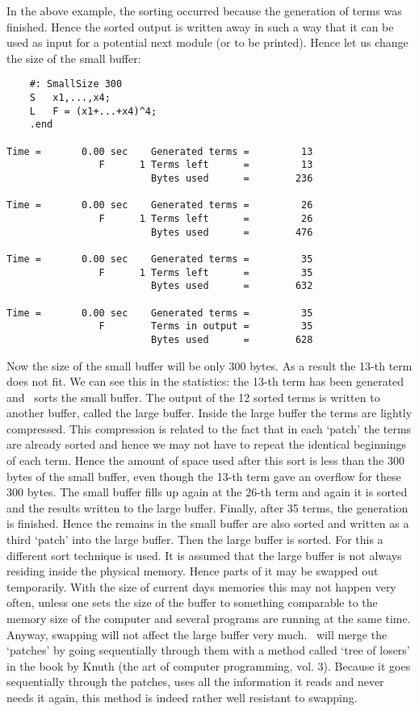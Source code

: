 In the above example, the sorting occurred because the generation of terms 
was finished. Hence the sorted output is written away in such a way that it 
can be used as input for a potential next module (or to be printed). 
Hence let us change the size of the small buffer:
\begin{verbatim}
    #: SmallSize 300
    S	x1,...,x4;
    L	F = (x1+...+x4)^4;
    .end

Time =       0.00 sec    Generated terms =         13
                F      1 Terms left      =         13
                         Bytes used      =        236

Time =       0.00 sec    Generated terms =         26
                F      1 Terms left      =         26
                         Bytes used      =        476

Time =       0.00 sec    Generated terms =         35
                F      1 Terms left      =         35
                         Bytes used      =        632

Time =       0.00 sec    Generated terms =         35
                F        Terms in output =         35
                         Bytes used      =        628
\end{verbatim}
Now the size of the small buffer will be only 300 bytes. As a result the 
13-th term does not fit. We can see this in the statistics: the 13-th term 
has been generated and \FORM\ sorts the small buffer. The output of the 12 
sorted terms is written to another buffer, called the
large buffer. Inside the large 
buffer the terms are lightly compressed. This compression is related to the 
fact that in each `patch' the terms are already sorted and 
hence we may not have to repeat the identical beginnings of each term. 
Hence the amount of space used after this sort is less than the 300 bytes 
of the small buffer, even though the 13-th term gave an overflow for these 
300 bytes. The small buffer fills up again at the 26-th term and again it 
is sorted and the results written to the large buffer. Finally, after 35 
terms, the generation is finished. Hence the remains in the small buffer 
are also sorted and written as a third `patch' into the large buffer. Then 
the large buffer is sorted. For this a different sort technique is used. It 
is assumed that the large buffer is not always residing inside the physical 
memory. Hence parts of it may be swapped out temporarily. With the size of 
current days memories this may not happen very often, unless one sets the 
size of the buffer to something comparable to the memory size of the 
computer and several programs are running at the same time. Anyway, 
swapping will not affect the large buffer very much. \FORM\ will merge the 
`patches' by going sequentially through them with a method called 
`tree of losers' in the book by Knuth 
(the art of computer programming, vol. 3). Because it goes sequentially 
through the patches, uses all the information it reads and never needs it 
again, this method is indeed rather well resistant to swapping.

